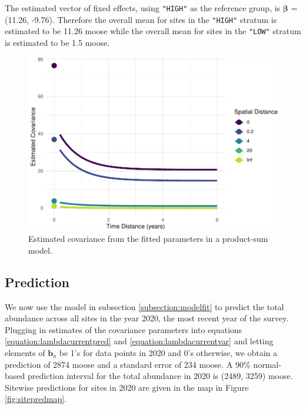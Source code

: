 \documentclass[]{interact}
\theoremstyle{plain}%
\theoremstyle{definition}
\theoremstyle{remark}
\begin{document}
The estimated vector of fixed effects, using \texttt{"HIGH"} as the
reference group, is \(\bm{\beta}\) = (11.26, -9.76). Therefore the
overall mean for sites in the \texttt{"HIGH"} stratum is estimated to be
11.26 moose while the overall mean for sites in the \texttt{"LOW"}
stratum is estimated to be 1.5 moose.

\begin{figure}
\centering
\includegraphics{fpspatiotemp_manu_files/figure-latex/covplot-1.pdf}
\caption{\label{fig:covplot} Estimated covariance from the fitted
parameters in a product-sum model.}
\end{figure}

\subsection{Prediction}

We now use the model in subsection \ref{subsection:modelfit} to predict
the total abundance across all sites in the year 2020, the most recent
year of the survey. Plugging in estimates of the covariance parameters
into equations \ref{equation:lambdacurrentpred} and
\ref{equation:lambdacurrentvar} and letting elements of \(\mathbf{b}_a\)
be 1's for data points in 2020 and 0's otherwise, we obtain a prediction
of 2874 moose and a standard error of 234 moose. A 90\% normal-based
prediction interval for the total abundance in 2020 is (2489, 3259)
moose. Sitewise predictions for sites in 2020 are given in the map in
Figure \ref{fig:sitepredmap}.
\end{document}
